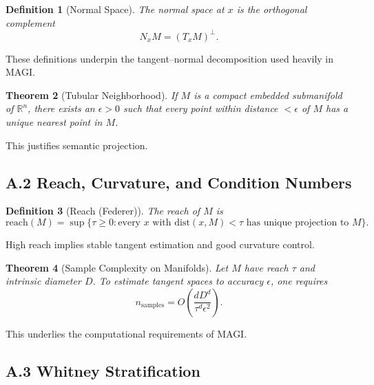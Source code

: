 \documentclass[11pt,a4paper,twocolumn]{article}
\newtheorem{theorem}{Theorem}[section]
\newtheorem{definition}[theorem]{Definition}
\begin{document}
\begin{definition}[Normal Space]
The normal space at $x$ is the orthogonal complement
\[
N_x M = (T_x M)^\perp.
\]
\end{definition}

These definitions underpin the tangent–normal decomposition used heavily
in MAGI.

\begin{theorem}[Tubular Neighborhood]
If $M$ is a compact embedded submanifold of $\mathbb{R}^n$, there exists
an $\epsilon > 0$ such that every point within distance $< \epsilon$ of
$M$ has a unique nearest point in $M$.
\end{theorem}

This justifies semantic projection.


\subsection*{A.2 Reach, Curvature, and Condition Numbers}

\begin{definition}[Reach (Federer)]
The reach of $M$ is
\[
\mathrm{reach}(M) = \sup\{\tau \ge 0 : \text{every } x \text{ with }
\mathrm{dist}(x,M) < \tau \text{ has unique projection to } M\}.
\]
\end{definition}

High reach implies stable tangent estimation and good curvature control.

\begin{theorem}[Sample Complexity on Manifolds]
Let $M$ have reach $\tau$ and intrinsic diameter $D$.  
To estimate tangent spaces to accuracy $\epsilon$, one requires
\[
n_{\mathrm{samples}} = O\!\left(\frac{d D^d}{\tau^d \epsilon^2}\right).
\]
\end{theorem}

This underlies the computational requirements of MAGI.


\subsection*{A.3 Whitney Stratification}
\end{document}
